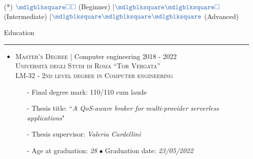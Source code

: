 \documentclass[english,10pt,a4paper]{article}
\newcommand{\CompanyName}[1]{\textsc{{\small #1}}}
\newcommand{\JobTimeRange}[1]{{\scriptsize \textcolor{CvColor!50}{\faCalendar*} \hspace{0.01cm} \textcolor{CvIcon}{#1}}}
\newcommand{\CvBullet}{\hspace{0.05cm} \textcolor{CvColor}{$\bullet$} \hspace{0.05cm}}
\newcommand{\CvSection}[2]{
	\hspace{0.25cm}\textcolor{CvColor!50}{#1} \hspace{0.01cm} \textcolor{CvColor!80}{#2}\\
	\textcolor{CvColor}{\rule[.7\baselineskip]{\textwidth}{1pt}}}
\newcommand{\CvSidebarSection}[2]{
	\textcolor{CvColor!50}{{\footnotesize #1}} \hspace{0.01cm} \textcolor{CvColor!80}{{\footnotesize #2}} \\
	\textcolor{CvColor}{\rule[.7\baselineskip]{0.8\textwidth}{1pt}}}
\newcommand{\FullBlock}{\textcolor{CvColor}{\mdlgblksquare}}
\newcommand{\EmptyBlock}{\textcolor{CvColor}{\square}}
\newcommand{\Sep}{\textcolor{CvColor}{|}\hspace{0.1cm}}
\begin{document}
\begin{paracol}{2}
\begin{tcolorbox}[colback=CvSidebarBackColor,height=\textheight,boxrule=1pt, left=0pt,right=1pt,top=0pt,bottom=0pt, arc=0pt,outer arc=0pt, colframe=CvSidebarBackColor]
\begin{center}
{\begin{tabular}{lcc|c}
	\end{tabular}}


	{\tiny \textcolor{CvColor}{(*)} \hspace{0.05cm} $\FullBlock\EmptyBlock\EmptyBlock$ (Beginner) \Sep $\FullBlock\FullBlock\EmptyBlock$ (Intermediate) \Sep $\FullBlock\FullBlock\FullBlock$ (Advanced)}

\vspace{0.5cm}	


\end{center}
	

	
\end{tcolorbox}
\switchcolumn  %
\begin{tcolorbox}[colback=white, height=\textheight, colframe=white, left=0cm]
		
\vspace{0.3cm}	
\CvSection{\faGraduationCap}{Education}
\begin{itemize}
	\item \CompanyName{Master’s Degree} \textcolor{CvColor}{|} {\scriptsize Computer engineering} \hfill \JobTimeRange{2018 - 2022}\\
	{\scriptsize \textcolor{CvIcon}{\textsc{Università degli Studi di Roma ``Tor Vergata''}}} \\
	{\scriptsize \textcolor{CvIcon}{\textsc{LM-32 - 2nd level degree in Computer engineering}}}
	{\scriptsize \begin{itemize}
			\item[-] Final degree mark: \textcolor{CvColor}{110/110 cum laude}
			\item[-] Thesis title: ``\textit{A QoS-aware broker for multi-provider serverless applications}"
			\item[-] Thesis supervisor: \textit{Valeria Cardellini}
			\item[-] Age at graduation: \textit{28} \CvBullet Graduation date: \textit{23/05/2022}	
	\end{itemize}}
	

\end{itemize}
\end{tcolorbox}
\end{paracol}
\end{document}
